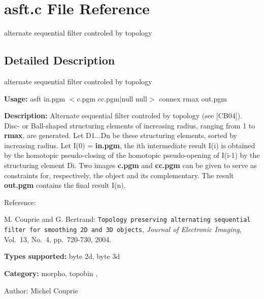 \section{asft.c File Reference}
\label{asft_8c}
alternate sequential filter controled by topology 



\subsection{Detailed Description}
alternate sequential filter controled by topology 

{\bf Usage:} asft in.pgm $<$c.pgm cc.pgm$|$null null$>$ connex rmax out.pgm

{\bf Description:} Alternate sequential filter controled by topology (see [CB04]). Disc- or Ball-shaped structuring elements of increasing radius, ranging from 1 to {\bf rmax}, are generated. Let D1...Dn be these structuring elements, sorted by increasing radius. Let I(0) = {\bf in.pgm}, the ith intermediate result I(i) is obtained by the homotopic pseudo-closing of the homotopic pseudo-opening of I(i-1) by the structuring element Di. Two images {\bf c.pgm} and {\bf cc.pgm} can be given to serve as constraints for, respectively, the object and its complementary. The result {\bf out.pgm} contains the final result I(n).

Reference:\par
 [CB04] M. Couprie and G. Bertrand: {\tt Topology preserving alternating sequential filter for smoothing 2D and 3D objects}, {\em  Journal of Electronic Imaging\/}, Vol.~13, No.~4, pp.~720-730, 2004.

{\bf Types supported:} byte 2d, byte 3d

{\bf Category:} morpho, topobin ,

\begin{Desc}
\item[Author:]Michel Couprie \end{Desc}
